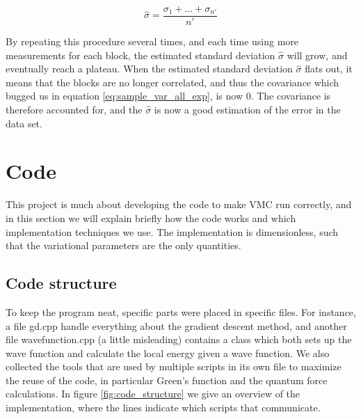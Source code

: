 \documentclass[norsk,a4paper,12pt]{article}
\begin{document}
 \begin{equation}
 \hat{\sigma} = \frac{\sigma_1 + ... + \sigma_{n'}}{n'}
 \end{equation}
 
By repeating this procedure several times, and each time using more measurements for each block, the estimated standard deviation $\hat{\sigma}$ will grow, and eventually reach a plateau. When the estimated standard deviation $\hat{\sigma}$ flats out, it means that the blocks are no longer correlated, and thus the covariance which bugged us in equation \ref{eq:sample_var_all_exp}, is now 0. The covariance is therefore accounted for, and the $\hat{\sigma}$ is now a good estimation of the error in the data set.


\section{Code} \label{sec:code}
This project is much about developing the code to make VMC run correctly, and in this section we will explain briefly how the code works and which implementation techniques we use. The implementation is dimensionless, such that the variational parameters are the only quantities. 

\subsection{Code structure}
To keep the program neat, specific parts were placed in specific files. For instance, a file gd.cpp handle everything about the gradient descent method, and another file wavefunction.cpp (a little misleading) contains a class which both sets up the wave function and calculate the local energy given a wave function. We also collected the tools that are used by multiple scripts in its own file to maximize the reuse of the code, in particular Green's function and the quantum force calculations. In figure \ref{fig:code_structure} we give an overview of the implementation, where the lines indicate which scripts that communicate. 
\end{document}

